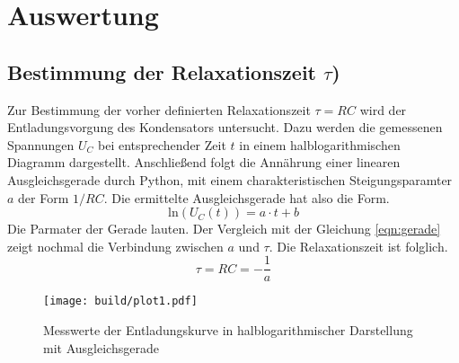 \section{Auswertung}
\subsection{Bestimmung der Relaxationszeit $\tau$)}  %
Zur Bestimmung der vorher definierten Relaxationszeit $\tau = RC$ wird der Entladungsvorgung des Kondensators untersucht.
Dazu werden die gemessenen Spannungen $U_{C}$ bei entsprechender Zeit $t$ in einem halblogarithmischen Diagramm dargestellt.
Anschließend folgt die Annährung einer linearen Ausgleichsgerade durch Python, mit einem charakteristischen Steigungsparamter $a$
der Form $1/RC$. 
Die ermittelte Ausgleichsgerade hat also die Form.
\begin{equation}
    \text{ln}(U_{C}(t)) = a \cdot t + b
\end{equation}
Die Parmater der Gerade lauten.
Der Vergleich mit der Gleichung \eqref{eqn:gerade} zeigt nochmal die Verbindung zwischen $a$ und $\tau$. Die Relaxationszeit ist folglich.
\begin{equation}
\tau = RC = - \frac{1}{a}
\end{equation}
 
\begin{figure}
    \centering 
    \texttt{[image: build/plot1.pdf]}
    \caption{Messwerte der Entladungskurve in halblogarithmischer Darstellung mit Ausgleichsgerade}
    \label{plt:plot1}
\end{figure} 
